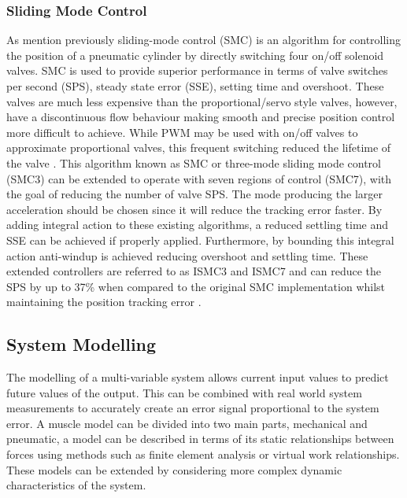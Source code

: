 \documentclass[11pt,a4paper]{article}
\begin{document}
\subsubsection{Sliding Mode Control}
\label{sub:sliding_mode_control}
As mention previously sliding-mode control (SMC) is an algorithm for controlling the position of a pneumatic cylinder by directly switching four on/off solenoid valves. SMC is used to provide superior performance in terms of valve switches per second (SPS), steady state error (SSE), setting time and overshoot. These valves are much less expensive than the proportional/servo style valves, however, have a discontinuous flow behaviour making smooth and precise position control more difficult to achieve. While PWM may be used with on/off valves to approximate proportional valves, this frequent switching reduced the lifetime of the valve \cite{zhang_bone_2018}. \newline
This algorithm known as SMC or three-mode sliding mode control (SMC3) can be extended to operate with seven regions of control (SMC7), with the goal of reducing the number of valve SPS. The mode producing the larger acceleration should be chosen since it will reduce the tracking error faster. By adding integral action to these existing algorithms, a reduced settling time and SSE can be achieved if properly applied. Furthermore, by bounding this integral action anti-windup is achieved reducing overshoot and settling time. These extended controllers are referred to as ISMC3 and ISMC7 and can reduce the SPS by up to 37\% when compared to the original SMC implementation whilst maintaining the position tracking error \cite{zhang_bone_2018}.

\subsection{System Modelling}
\label{sub:system_modelling}
The modelling of a multi-variable system allows current input values to predict future values of the output. This can be combined with real world system measurements to accurately create an error signal proportional to the system error. A muscle model can be divided into two main parts, mechanical and pneumatic, a model can be described in terms of its static relationships between forces using methods such as finite element analysis or virtual work relationships. These models can be extended by considering more complex dynamic characteristics of the system.
\end{document}
